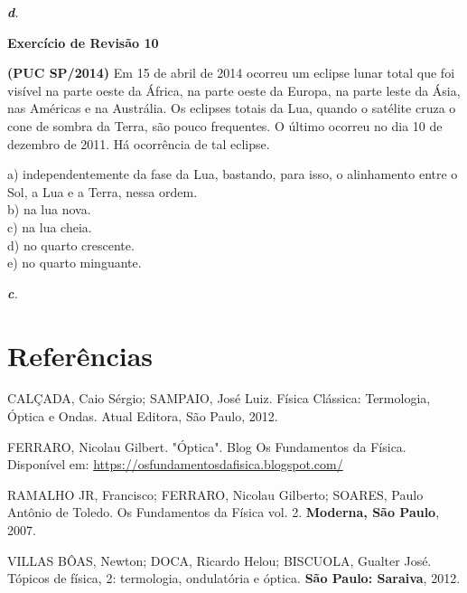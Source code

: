 \documentclass[11pt,twocolumn,oneside]{article}
\newenvironment{resposta*}
  {\bf Resposta:\\ }
  {}
\begin{document}
\begin{resposta*}
{\it \textbf{d}.}
\end{resposta*}

\textbf{Exercício de Revisão 10}


\textbf{(PUC SP/2014)} Em 15 de abril de 2014 ocorreu um eclipse lunar total que foi visível na parte oeste da África, na parte oeste da Europa, na parte leste da Ásia, nas Américas e na Austrália. Os eclipses totais da Lua, quando o satélite cruza o cone de sombra da Terra, são pouco frequentes. O último ocorreu no dia 10 de dezembro de 2011. Há ocorrência de tal eclipse.


a)	independentemente da fase da Lua, bastando, para isso, o alinhamento entre o Sol, a Lua e a Terra, nessa ordem. \\
b)	na lua nova. \\
c)	na lua cheia. \\
d)	no quarto crescente. \\
e)	no quarto minguante. \\


\begin{resposta*}
{\it \textbf{c}.}
\end{resposta*}

\hypertarget{x-referências}{\section{Referências}}
CALÇADA, Caio Sérgio; SAMPAIO, José Luiz. Física Clássica: Termologia, Óptica e Ondas. Atual Editora, São Paulo, 2012.


FERRARO, Nicolau Gilbert. "Óptica". Blog Os Fundamentos da Física. Disponível em: \href{https://osfundamentosdafisica.blogspot.com/}{https://osfundamentosdafisica.blogspot.com/}


RAMALHO JR, Francisco; FERRARO, Nicolau Gilberto; SOARES, Paulo Antônio de Toledo. Os Fundamentos da Física vol. 2. \textbf{Moderna, São Paulo}, 2007.


VILLAS BÔAS, Newton; DOCA, Ricardo Helou; BISCUOLA, Gualter José. Tópicos de física, 2: termologia, ondulatória e óptica. \textbf{São Paulo: Saraiva}, 2012.
\end{document}
